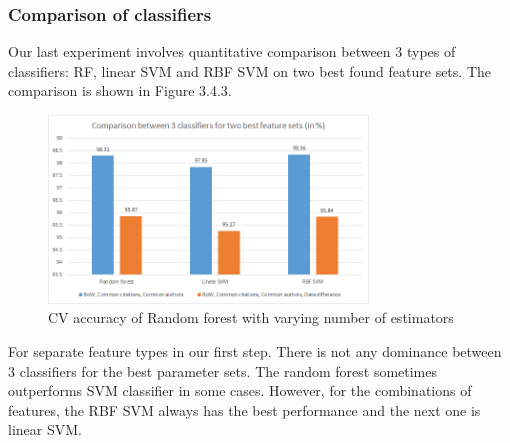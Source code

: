 \documentclass{article}
\begin{document}
\subsubsection{Comparison of classifiers}
Our last experiment involves quantitative comparison between 3 types of classifiers: RF, linear SVM and RBF SVM on two best found feature sets. The comparison is shown in Figure 3.4.3.
\begin{figure}[htb]
\begin{minipage}[b]{1.0\linewidth}
  \centering
  \centerline{\includegraphics[width=8.5cm]{classifier.png}}
\end{minipage}
\label{fig:classifier}
\caption{CV accuracy of Random forest with varying number of estimators}
\end{figure}
For separate feature types in our first step. There is not any dominance between 3 classifiers for the best parameter sets. The random forest sometimes outperforms SVM classifier in some cases. However, for the combinations of features, the RBF SVM always has the best performance and the next one is linear SVM.
\end{document}
